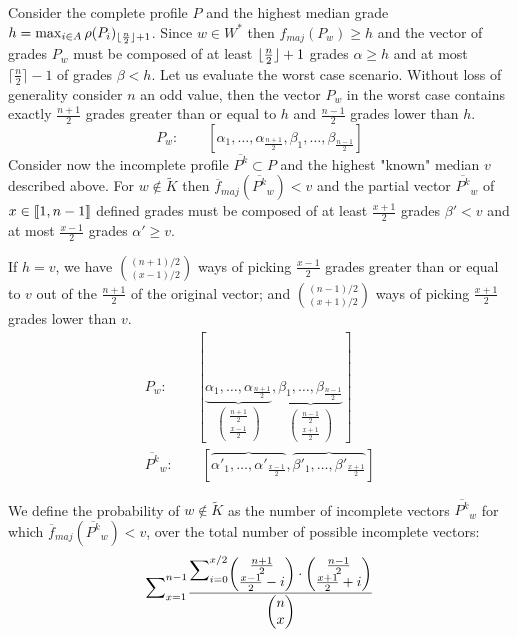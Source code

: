 \documentclass[version=3.21, pagesize, twoside=off, bibliography=totoc, DIV=calc, fontsize=12pt, a4paper]{scrartcl}
\begin{document}
Consider the complete profile $P$ and the highest median grade $h=\max_{i\in A}\rho(P_i)_{\lfloor\frac{n}{2}\rfloor + 1}$. Since $w \in W^*$ then $f_{maj}(P_{w})\geq h$ and the vector of grades $P_w$ must be composed of at least $\lfloor\frac{n}{2}\rfloor+1$ grades $\alpha \geq h$ and at most $\lceil \frac{n}{2}\rceil-1$ of grades $\beta < h$. Let us evaluate the worst case scenario.
Without loss of generality consider $n$ an odd value, then the vector $P_{w}$ in the worst case contains exactly $\frac{n+1}{2}$ grades greater than or equal to $h$ and $\frac{n-1}{2}$ grades lower than $h$.
\[P_w : \qquad [ \alpha_1, \dots , \alpha_{\frac{n+1}{2}}, \beta_1, \dots , \beta_{\frac{n-1}{2}} ] \]
Consider now the incomplete profile $\overline{P^k} \subset P$ and the highest "known" median $v$ described above. For $w \notin \tilde{K}$ then $\overline{f}_{maj}(\overline{P^k}_w) < v$ and the partial vector $\overline{P^k}_w$ of $x\in \llbracket1,n-1\rrbracket$ defined grades must be composed of at least $\frac{x+1}{2}$ grades $\beta'<v$ and at most $\frac{x-1}{2}$ grades $\alpha' \geq v$. 

If $h=v$, we have $\binom{(n+1)/2}{(x-1)/2}$ ways of picking $\frac{x-1}{2}$ grades greater than or equal to $v$ out of the $\frac{n+1}{2}$ of the original vector; and $\binom{(n-1)/2}{(x+1)/2}$ ways of picking $\frac{x+1}{2}$ grades lower than $v$.
\begin{align}
	P_{w}: \qquad [ \underbrace{\alpha_1, \dots , \alpha_{\frac{n+1}{2}}}_{\begin{pmatrix}\frac{n+1}{2} \\ \frac{x-1}{2}\end{pmatrix}}, \underbrace{\beta_1, \dots , \beta_{\frac{n-1}{2}}}_{\begin{pmatrix}\frac{n-1}{2} \\ {\frac{x+1}{2}}\end{pmatrix}} ] \\
	\overline{P^k}_w:\qquad [ \overbrace{\alpha'_1, \dots , \alpha'_{\frac{x-1}{2}}}, \overbrace{\beta'_1, \dots , \beta'_{\frac{x+1}{2}}}]
\end{align} 
\newcommand{\largemath}[1]{{\mathlarger{\mathlarger{\mathlarger{\mathlarger{\mathlarger#1}}}}}}

We define the probability of $w \notin \tilde{K}$ as the number of incomplete vectors $\overline{P^k}_w$ for which $\overline{f}_{maj}(\overline{P^k}_w) < v$, over the total number of possible incomplete vectors:
\[ \largemath{\sum}_{x=1}^{n-1}{ \frac{ \largemath{\sum}_{i=0}^{x/2}{ \begin{pmatrix}\frac{n+1}{2} \\ {\frac{x-1}{2}-i}\end{pmatrix} \cdot \begin{pmatrix}\frac{n-1}{2} \\ {\frac{x+1}{2}+i}\end{pmatrix} }}{\begin{pmatrix}n \\ x\end{pmatrix}} } \]
\end{document}
